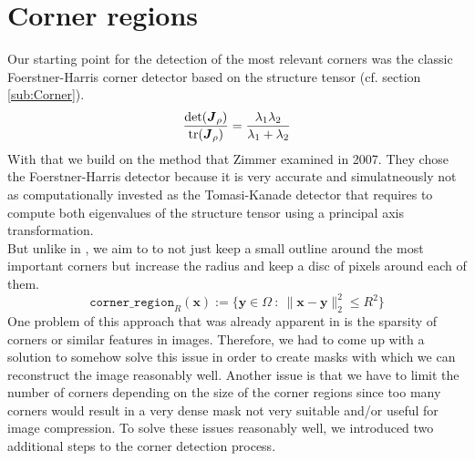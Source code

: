 \section{Corner regions}\label{sec:Contribution}
Our starting point for the detection of the most relevant corners was the classic Foerstner-Harris
corner detector based on the structure tensor (cf. section \ref{sub:Corner}). 
\begin{equation}
    \frac{\textnormal{det}(\boldsymbol J_\rho)}{\textnormal{tr}(\boldsymbol J_\rho)} =
    \frac{\lambda_1\lambda_2}{\lambda_1 + \lambda_2}\label{def:Harris}
\end{equation}
With that we build on the method that Zimmer \cite{zimmer07} examined in 2007. They chose the
Foerstner-Harris detector because it is very accurate and simulatneously not as computationally
invested as the Tomasi-Kanade detector that requires to compute both eigenvalues of the structure
tensor using a principal axis transformation.\\
But unlike in \cite{zimmer07}, we aim to to not just keep a small outline around the most important
corners but increase the radius and keep a disc of pixels around each of them. 
\begin{equation}
    \texttt{corner\_region}_R(\boldsymbol x) := \lbrace \boldsymbol y \in \Omega\ : \ \lVert \boldsymbol
    x - \boldsymbol y\rVert_2^2 \leq R^2 \rbrace
\end{equation}
One problem of this approach that was already apparent in \cite{zimmer07} is the sparsity of
corners or similar features in images. Therefore, we had to come up with a solution to somehow
solve this issue in order to create masks with which we can reconstruct the image reasonably 
well.
Another issue is that we have to limit the number of corners depending on the size of the corner
regions since too many corners would result in a very dense mask not very suitable and/or
useful for image compression. 
To solve these issues reasonably well, we introduced two additional steps to the corner detection
process.
